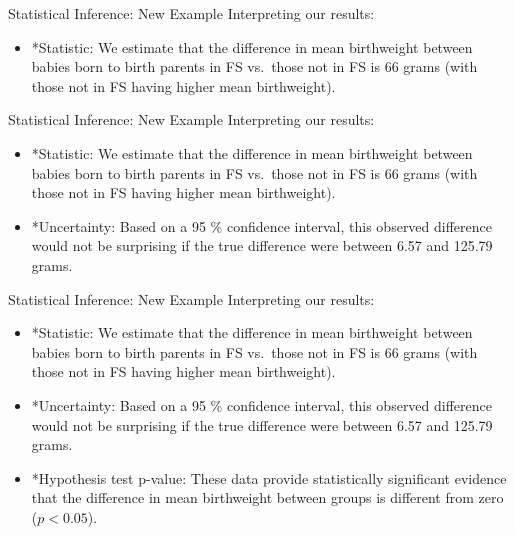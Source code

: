 \documentclass[
  ignorenonframetext,
]{beamer}
\providecommand{\tightlist}{%
  \setlength{\itemsep}{0pt}\setlength{\parskip}{0pt}}
\begin{document}
\begin{frame}{Statistical Inference: New Example}
\protect\hypertarget{statistical-inference-new-example-11}{}
Interpreting our results:

\begin{itemize}
\tightlist
\item
  *Statistic: We estimate that the difference in mean birthweight
  between babies born to birth parents in FS vs.~those not in FS is 66
  grams (with those not in FS having higher mean birthweight).
\end{itemize}
\end{frame}

\begin{frame}{Statistical Inference: New Example}
\protect\hypertarget{statistical-inference-new-example-12}{}
Interpreting our results:

\begin{itemize}
\tightlist
\item
  *Statistic: We estimate that the difference in mean birthweight
  between babies born to birth parents in FS vs.~those not in FS is 66
  grams (with those not in FS having higher mean birthweight).
\item
  *Uncertainty: Based on a 95 \% confidence interval, this observed
  difference would not be surprising if the true difference were between
  6.57 and 125.79 grams.
\end{itemize}
\end{frame}

\begin{frame}{Statistical Inference: New Example}
\protect\hypertarget{statistical-inference-new-example-13}{}
Interpreting our results:

\begin{itemize}
\tightlist
\item
  *Statistic: We estimate that the difference in mean birthweight
  between babies born to birth parents in FS vs.~those not in FS is 66
  grams (with those not in FS having higher mean birthweight).
\item
  *Uncertainty: Based on a 95 \% confidence interval, this observed
  difference would not be surprising if the true difference were between
  6.57 and 125.79 grams.
\item
  *Hypothesis test p-value: These data provide statistically significant
  evidence that the difference in mean birthweight between groups is
  different from zero (\(p < 0.05\)).
\end{itemize}
\end{frame}
\end{document}

